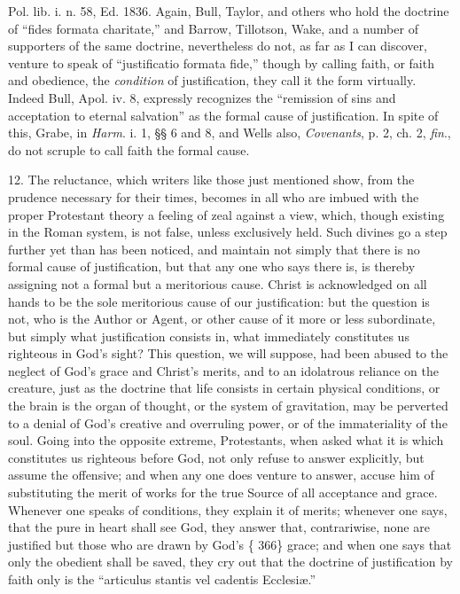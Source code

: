 Pol. lib. i. n. 58, Ed. 1836. Again, Bull, Taylor, and others who hold
the doctrine of ``fides formata charitate,'' and Barrow,
Tillotson, Wake, and a number of supporters of the same doctrine,
nevertheless do not, as far as I can discover, venture to speak of
``justificatio formata fide,'' though by calling faith, or
faith and obedience, the \emph{condition} of justification, they
call it the form virtually. Indeed Bull, Apol. iv. 8, expressly
recognizes the ``remission of sins and acceptation to eternal
salvation'' as the formal cause of justification. In spite of
this, Grabe, in \emph{Harm}. i. 1, §§ 6 and 8, and Wells also, \emph{Covenants},
p. 2, ch. 2, \emph{fin}., do not scruple to call faith the formal
cause.

12. The reluctance, which writers like those just mentioned show,
from the prudence necessary for their times, becomes in all who are
imbued with the proper Protestant theory a feeling of zeal against a
view, which, though existing in the Roman system, is not false, unless
exclusively held. Such divines go a step further yet than has been
noticed, and maintain not simply that there is no formal cause of
justification, but that any one who says there is, is thereby
assigning not a formal but a meritorious cause. Christ is acknowledged
on all hands to be the sole meritorious cause of our justification:
but the question is not, who is the Author or Agent, or other cause of
it more or less subordinate, but simply what justification consists
in, what immediately constitutes us righteous in God's sight? This
question, we will suppose, had been abused to the neglect of God's
grace and Christ's merits, and to an idolatrous reliance on the
creature, just as the doctrine that life consists in certain physical
conditions, or the brain is the organ of thought, or the system of
gravitation, may be perverted to a denial of God's creative and
overruling power, or of the immateriality of the soul. Going into the
opposite extreme, Protestants, when asked what it is which constitutes
us righteous before God, not only refuse to answer explicitly, but
assume the offensive; and when any one does venture to answer, accuse
him of substituting the merit of works for the true Source of all
acceptance and grace. Whenever one speaks of conditions, they explain
it of merits; whenever one says, that the pure in heart shall see God,
they answer that, contrariwise, none are justified but those who are
drawn by God's \{ 366\} grace; and when one says that only the obedient
shall be saved, they cry out that the doctrine of justification by
faith only is the ``articulus stantis vel cadentis Ecclesiæ.''

